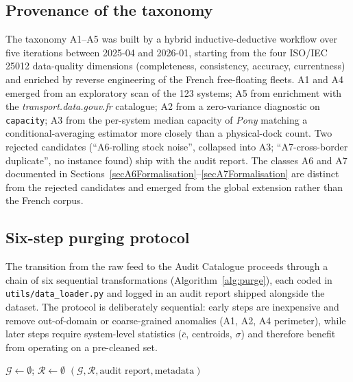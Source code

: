\documentclass[11pt,a4paper]{article}
\begin{document}
\subsection{Provenance of the taxonomy}
The taxonomy A1--A5 was built by a hybrid inductive-deductive
workflow over five iterations between 2025-04 and 2026-01, starting
from the four ISO/IEC 25012 data-quality dimensions (completeness,
consistency, accuracy, currentness) and enriched by reverse
engineering of the French free-floating fleets. A1 and A4 emerged
from an exploratory scan of the 123 systems; A5 from enrichment with
the \emph{transport.data.gouv.fr} catalogue; A2 from a zero-variance
diagnostic on \texttt{capacity}; A3 from the per-system median
capacity of \emph{Pony} matching a conditional-averaging estimator
more closely than a physical-dock count. Two rejected candidates
(``A6-rolling stock noise'', collapsed into A3; ``A7-cross-border
duplicate'', no instance found) ship with the audit report. The
classes A6 and A7 documented in
Sections~\ref{secA6Formalisation}--\ref{secA7Formalisation} are
distinct from the rejected candidates and emerged from the global
extension rather than the French corpus.

\subsection{Six-step purging protocol}
The transition from the raw feed to the Audit Catalogue proceeds through
a chain of six sequential transformations (Algorithm~\ref{alg:purge}),
each coded in \texttt{utils/data\_loader.py} and logged in an audit
report shipped alongside the dataset. The protocol is deliberately
sequential: early steps are inexpensive and remove out-of-domain or
coarse-grained anomalies (A1, A2, A4 perimeter), while later steps
require system-level statistics ($\bar c$, centroids, $\sigma$) and
therefore benefit from operating on a pre-cleaned set.

\begin{algorithm}[ht]
\SetAlgoLined
\DontPrintSemicolon
{}
$\mathcal{G} \gets \emptyset$; $\mathcal{R} \gets \emptyset$\;
\Return $(\mathcal{G}, \mathcal{R}, \text{audit report}, \text{metadata})$\;
\caption{GBFS-to-Gold-Standard purging pipeline.}
\label{alg:purge}
\end{algorithm}
\end{document}
